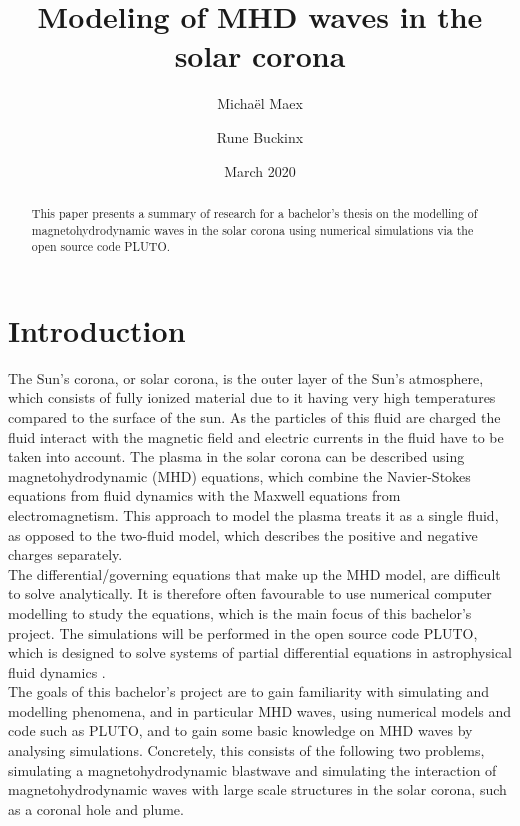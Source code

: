 \documentclass[a4paper]{article}
\title{Modeling of MHD waves in the solar corona}
\author{Micha\"el Maex \and Rune Buckinx}
\date{March 2020}
\numberwithin{figure}{section}
\numberwithin{equation}{section}
\begin{document}
\maketitle

\begin{abstract}
    This paper presents a summary of research for a bachelor's thesis on the modelling of magnetohydrodynamic waves in the solar corona using numerical simulations via the open source code PLUTO. 
\end{abstract}
\newpage
\tableofcontents

\pagebreak

\listoffigures

\listoftodos

\newpage
{}
\section{Introduction} \label{sec:introduction}
The Sun's corona, or solar corona, is the outer layer of the Sun's atmosphere, which consists of fully ionized material due to it having very high temperatures compared to the surface of the sun. 
As the particles of this fluid are charged the fluid interact with the magnetic field and electric currents in the fluid have to be taken into account.  
The plasma in the solar corona can be described using magnetohydrodynamic (MHD) equations, which combine the Navier-Stokes equations from fluid dynamics with the Maxwell equations from electromagnetism. 
This approach to model the plasma treats it as a single fluid, as opposed to the two-fluid model, which describes the positive and negative charges separately. \\

The differential/governing equations that make up the MHD model, are difficult to solve analytically. 
It is therefore often favourable to use numerical computer modelling to study the equations, which is the main focus of this bachelor's project. 
The simulations will be performed in the open source code PLUTO, which is designed to solve systems of partial differential equations in astrophysical fluid dynamics \cite{mignone2011pluto}.\\

The goals of this bachelor's project are to gain familiarity with simulating and modelling phenomena, and in particular MHD waves, using numerical models and code such as PLUTO, and to gain some basic knowledge on MHD waves by analysing simulations. Concretely, this consists of the following two problems, simulating a magnetohydrodynamic blastwave and simulating the interaction of magnetohydrodynamic waves with large scale structures in the solar corona, such as a coronal hole and plume.
\end{document}
